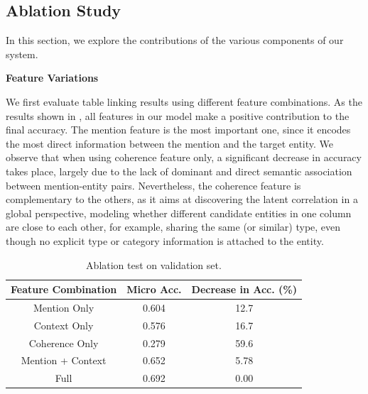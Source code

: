 \subsection{Ablation Study}
\label{sec:exp-ablation}

In this section, we explore the contributions of the various components of our system.

\noindent
\textbf{Feature Variations}

We first evaluate table linking results using different feature combinations.
As the results shown in ,
all features in our model make a positive contribution to the final accuracy.
The mention feature is the most important one, since it encodes
the most direct information between the mention and the target entity.
We observe that when using coherence feature only, a significant decrease in
accuracy takes place, largely due to the lack of dominant and direct 
semantic association between mention-entity pairs.
Nevertheless, the coherence feature is complementary to the others,
as it aims at discovering the latent correlation in a global perspective,
modeling whether different candidate entities in one column 
are close to each other, for example, sharing the same (or similar) type,
even though no explicit type or category information is attached to the entity.

\begin{table}[ht]
 	\small
	\centering
	\caption{Ablation test on validation set.}
	\label{tab:ablation-features}
	\begin{tabular} {c|c|c}
        \hline
		Feature Combination &   Micro Acc.  & Decrease in Acc. (\%) \\
		\hline
		Mention Only           &   0.604    & 12.7 \\
		Context Only        &   0.576    & 16.7   \\
		Coherence Only      &   0.279    & 59.6     \\
		Mention + Context      &   0.652    & 5.78    \\
		\hline
		Full                &   0.692    & 0.00  \\
        \hline
	\end{tabular}
\end{table}


